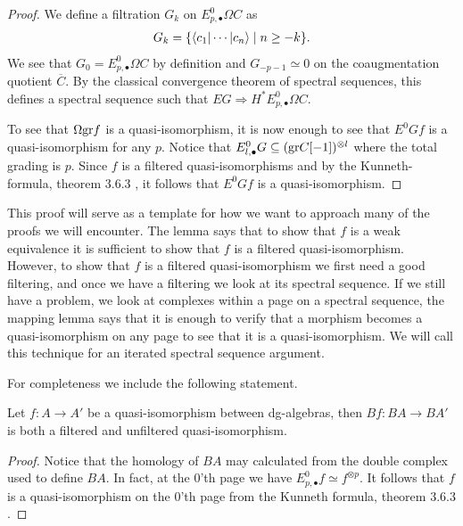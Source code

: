 \documentclass[../thesis.tex]{subfiles}
\begin{document}
\begin{proof}
                We define a filtration $G_k$ on $E^0_{p,\bullet}\Omega C$ as
                \begin{align*}
                    G_k = \startset{\langle c_1 | \cdots | c_n \rangle \mid n \geq -k}.
                \end{align*}
                We see that $G_0 = E^0_{p, \bullet}\Omega C$ by definition and $G_{-p-1} \simeq 0$ on the coaugmentation quotient $\overline{C}$. By the classical convergence theorem of spectral sequences, this defines a spectral sequence such that $EG \Rightarrow H^*E^0_{p, \bullet}\Omega C$.

                To see that $\Omega \tt{gr}f$ is a quasi-isomorphism, it is now enough to see that $E^0Gf$ is a quasi-isomorphism for any $p$. Notice that $E^0_{l,\bullet}G \subseteq (\tt{gr}C[-1])^{\otimes l}$ where the total grading is $p$. Since $f$ is a filtered quasi-isomorphisms and by the Kunneth-formula, theorem 3.6.3 \cite{Weibel94}, it follows that $E^0Gf$ is a quasi-isomorphism.
            \end{proof}

            This proof will serve as a template for how we want to approach many of the proofs we will encounter. The lemma says that to show that $f$ is a weak equivalence it is sufficient to show that $f$ is a filtered quasi-isomorphism. However, to show that $f$ is a filtered quasi-isomorphism we first need a good filtering, and once we have a filtering we look at its spectral sequence. If we still have a problem, we look at complexes within a page on a spectral sequence, the mapping lemma says that it is enough to verify that a morphism becomes a quasi-isomorphism on any page to see that it is a quasi-isomorphism. We will call this technique for an iterated spectral sequence argument.

            For completeness we include the following statement.

            \begin{lemma}
                Let $f : A \rightarrow A'$ be a quasi-isomorphism between dg-algebras, then $Bf : BA \rightarrow BA'$ is both a filtered and unfiltered quasi-isomorphism.
            \end{lemma}

            \begin{proof}
                Notice that the homology of $BA$ may calculated from the double complex used to define $BA$. In fact, at the $0$'th page we have $E^0_{p, \bullet}f \simeq f^{\otimes p}$. It follows that $f$ is a quasi-isomorphism on the $0$'th page from the Kunneth formula, theorem 3.6.3 \cite{Weibel94}.            
            \end{proof}
\end{document}
